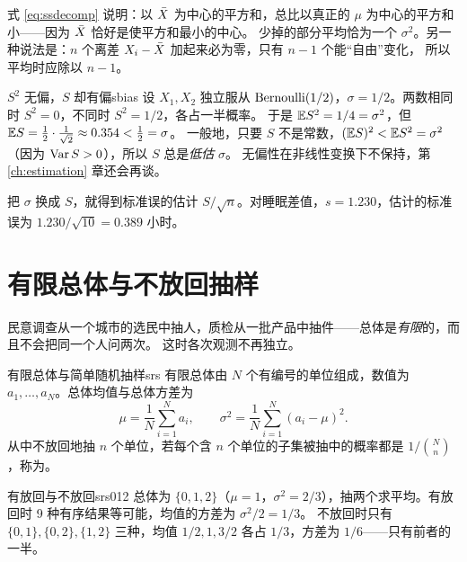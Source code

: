 \begin{intuition}
式 \eqref{eq:ssdecomp} 说明：以 $\bar{X}$ 为中心的平方和，总比以真正的 $\mu$ 为中心的平方和小——因为 $\bar{X}$ 恰好是使平方和最小的中心。
少掉的部分平均恰为一个 $\sigma^2$。另一种说法是：$n$ 个离差 $X_i-\bar{X}$ 加起来必为零，只有 $n-1$ 个能“自由”变化，
所以平均时应除以 $n-1$。
\end{intuition}

\begin{example}{\texorpdfstring{$S^2$}{S²} 无偏，\texorpdfstring{$S$}{S} 却有偏}{sbias}
设 $X_1,X_2$ 独立服从 $\operatorname{Bernoulli}(1/2)$，$\sigma=1/2$。两数相同时 $S^2=0$，不同时 $S^2=1/2$，各占一半概率。
于是 $\mathbb{E} S^2=1/4=\sigma^2$，但 $\mathbb{E} S=\frac12\cdot\frac1{\sqrt2}\approx0.354<\frac12=\sigma$。
一般地，只要 $S$ 不是常数，$(\mathbb{E} S)^2<\mathbb{E} S^2=\sigma^2$（因为 $\operatorname{Var} S>0$），所以 $S$ 总是\emph{低估} $\sigma$。
无偏性在非线性变换下不保持，第 \ref{ch:estimation} 章还会再谈。
\end{example}

把 $\sigma$ 换成 $S$，就得到标准误的估计 $S/\sqrt n$。对睡眠差值，$s=1.230$，估计的标准误为 $1.230/\sqrt{10}=0.389$ 小时。

\section{有限总体与不放回抽样}

民意调查从一个城市的选民中抽人，质检从一批产品中抽件——总体是\emph{有限}的，而且不会把同一个人问两次。
这时各次观测不再独立。

\begin{definition}{有限总体与简单随机抽样}{srs}
有限总体由 $N$ 个有编号的单位组成，数值为 $a_1,\dots,a_N$。总体均值与总体方差为
\[
\mu=\frac1N\sum_{i=1}^Na_i,\qquad \sigma^2=\frac1N\sum_{i=1}^N(a_i-\mu)^2 .
\]
从中不放回地抽 $n$ 个单位，若每个含 $n$ 个单位的子集被抽中的概率都是 $1/\binom Nn$，称为。
\end{definition}

\begin{example}{有放回与不放回}{srs012}
总体为 $\{0,1,2\}$（$\mu=1$，$\sigma^2=2/3$），抽两个求平均。有放回时 9 种有序结果等可能，均值的方差为 $\sigma^2/2=1/3$。
不放回时只有 $\{0,1\},\{0,2\},\{1,2\}$ 三种，均值 $1/2,1,3/2$ 各占 $1/3$，方差为 $1/6$——只有前者的一半。
\end{example}

